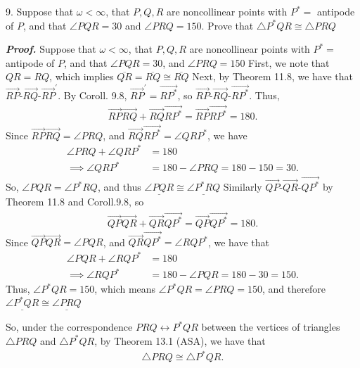 \documentclass{report}
\begin{document}
    \bigbreak \noindent 
    \begin{mdframed}
        9. Suppose that $\omega < \infty$, that $P,Q,R$ are noncollinear points with $P^{*} = $ antipode of $P$, and that $\angle PQR = 30$ and $\angle PRQ = 150$. Prove that $\triangle P^{*}QR \cong \triangle PRQ $ 
    \end{mdframed}
    \bigbreak \noindent 
    \textbf{\textit{Proof.}} Suppose that $\omega < \infty$, that $P,Q,R$ are noncollinear points with $P^{*} = $ antipode of $P$, and that $\angle PQR  = 30$, and $\angle PRQ = 150$
    \bigbreak \noindent 
    First, we note that  $QR = RQ$, which implies $ \overline{QR} = \overline{RQ} \cong \overline{RQ}$
    \bigbreak \noindent 
    Next, by Theorem 11.8, we have that $ \overrightarrow{RP}\text{-}\overrightarrow{RQ}\text{-} \overrightarrow{RP}^{\prime}$. By Coroll. 9.8, $\overrightarrow{RP}^{\prime} = \overrightarrow{RP^{*}}$, so $ \overrightarrow{RP}\text{-}\overrightarrow{RQ}\text{-}\overrightarrow{RP^{*}}$. Thus,
    \begin{align*}
        \overrightarrow{RP}\overrightarrow{RQ} + \overrightarrow{RQ}\overrightarrow{RP^{*}} = \overrightarrow{RP}\overrightarrow{RP^{*} } = 180
    .\end{align*}
    Since $ \overrightarrow{RP}\overrightarrow{RQ}= \angle PRQ$, and $ \overrightarrow{RQ}\overrightarrow{RP^{*}} = \angle QRP^{*}$, we have
    \begin{align*}
        \angle PRQ + \angle QRP^{*} &= 180 \\
        \implies \angle QRP^{*} &= 180 - \angle PRQ = 180 - 150 = 30
    .\end{align*}
    So, $ \angle PQR = \angle P^{*}RQ$, and thus $ \underline{\angle PQR} \cong \underline{\angle P^{*}RQ} $
    \bigbreak \noindent 
    Similarly $ \overrightarrow{QP}\text{-}\overrightarrow{QR}\text{-}\overrightarrow{QP^{*}}$ by Theorem 11.8 and Coroll.9.8,  so
    \begin{align*}
        \overrightarrow{QP}\overrightarrow{QR} + \overrightarrow{QR}\overrightarrow{QP^{*}} = \overrightarrow{QP}\overrightarrow{QP^{*}} = 180
    .\end{align*}
    Since $ \overrightarrow{QP}\overrightarrow{QR} = \angle PQR$, and $ \overrightarrow{QR}\overrightarrow{QP^{*}} = \angle RQP^{*}$, we have that
    \begin{align*}
        \angle PQR + \angle RQP^{*} &= 180  \\
        \implies \angle RQP^{*} &= 180 - \angle PQR = 180 - 30 = 150
    .\end{align*}
    Thus, $\angle P^{*}QR = 150$, which means $\angle P^{*}QR = \angle PRQ = 150$, and therefore $\underline{\angle P^{*}QR} \cong \underline{\angle PRQ} $
    
    \bigbreak \noindent 
    So, under the correspondence $PRQ \leftrightarrow P^{*}QR$ between the vertices of triangles $ \triangle PRQ$ and $ \triangle P^{*}QR$, by Theorem 13.1 (ASA), we have that 
    \begin{align*}
        \triangle PRQ \cong \triangle P^{*}QR
    .\end{align*}
    \endpf


    
    
\end{document}
